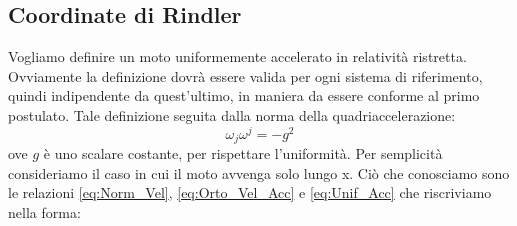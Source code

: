    \subsection{Coordinate di Rindler}\label{sec:1.7}
Vogliamo definire un moto uniformemente accelerato in relatività ristretta. Ovviamente la definizione dovrà essere valida per ogni sistema di riferimento, quindi indipendente da quest'ultimo, in maniera da essere conforme al primo postulato. Tale definizione seguita dalla norma della quadriaccelerazione:
\begin{equation}\label{eq:Unif_Acc}
    \omega_j\omega^j=-g^2
\end{equation}
ove $g$ è uno scalare costante, per rispettare l'uniformità. Per semplicità consideriamo il caso in cui il moto avvenga solo lungo x. Ciò che conosciamo sono le relazioni \eqref{eq:Norm_Vel}, \eqref{eq:Orto_Vel_Acc} e \eqref{eq:Unif_Acc} che riscriviamo nella forma:


